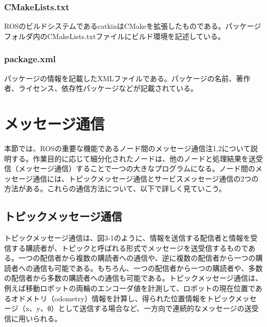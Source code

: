 \subsubsection{CMakeLists.txt}
ROSのビルドシステムであるcatkinはCMakeを拡張したものである。パッケージフォルダ内のCMakeLists.txtファイルにビルド環境を記述している。

\subsubsection{package.xml}
パッケージの情報を記載したXMLファイルである。パッケージの名前、著作者、ライセンス、依存性パッケージなどが記載されている。

\section{メッセージ通信}

本節では、ROSの重要な機能であるノード間のメッセージ通信注1,2について説明する。作業目的に応じて細分化されたノードは、他のノードと処理結果を送受信（メッセージ通信）することで一つの大きなプログラムになる。ノード間のメッセージ通信には、トピックメッセージ通信とサービスメッセージ通信の2つの方法がある。これらの通信方法について、以下で詳しく見ていこう。

\subsection{トピックメッセージ通信}
トピックメッセージ通信は、図3-1のように、情報を送信する配信者と情報を受信する購読者が、トピックと呼ばれる形式でメッセージを送受信するものである。一つの配信者から複数の購読者への通信や、逆に複数の配信者から一つの購読者への通信も可能である。もちろん、一つの配信者から一つの購読者や、多数の配信者から多数の購読者への通信も可能である。トピックメッセージ通信は、例えば移動ロボットの両輪のエンコーダ値を計測して、ロボットの現在位置であるオドメトリ（odometry）情報を計算し、得られた位置情報をトピックメッセージ（x、y、θ）として送信する場合など、一方向で連続的なメッセージの送受信に用いられる。

